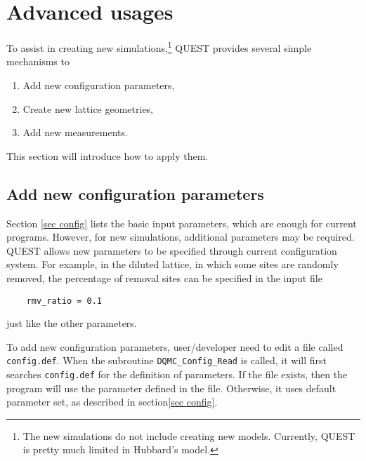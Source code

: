 \documentclass[12pt]{article}
\begin{document}
\section{Advanced usages}\label{sec adv}
To assist in creating new simulations,\footnote{The new simulations do not include creating new models. Currently, QUEST is pretty much limited in Hubbard's model.} QUEST provides several simple mechanisms to
\begin{enumerate}
 \item Add new configuration parameters,
 \item Create new lattice geometries,
 \item Add new measurements.
\end{enumerate}
This section will introduce how to apply them.

\subsection{Add new configuration parameters}
Section \ref{sec config} lists the basic input parameters, which are enough for current programs. However, for new simulations, additional parameters may be required. QUEST allows new parameters to be specified through current configuration system. For example, in the diluted lattice, in which some sites are randomly removed, the percentage of removal sites can be specified in the input file
\begin{verbatim}
    rmv_ratio = 0.1
\end{verbatim}
just like the other parameters.

To add new configuration parameters, user/developer need to edit a file called \verb"config.def".  When the subroutine \verb"DQMC_Config_Read" is called, it will first searches \verb"config.def" for the definition of parameters. If the file exists, then the program will use the parameter defined in the file. Otherwise, it uses default parameter set, as described in section\ref{sec config}.
\end{document}
